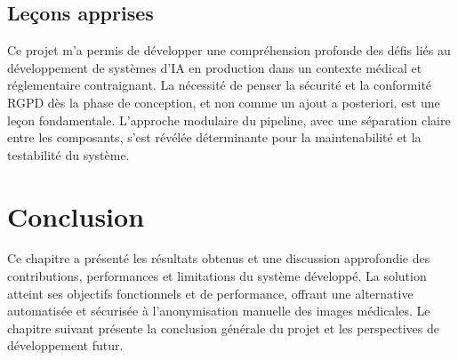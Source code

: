 \subsection{Leçons apprises}

Ce projet m'a permis de développer une compréhension profonde des défis liés au développement de systèmes d'IA en production dans un contexte médical et réglementaire contraignant. La nécessité de penser la sécurité et la conformité RGPD dès la phase de conception, et non comme un ajout a posteriori, est une leçon fondamentale. L'approche modulaire du pipeline, avec une séparation claire entre les composants, s'est révélée déterminante pour la maintenabilité et la testabilité du système.

\section*{Conclusion}
Ce chapitre a présenté les résultats obtenus et une discussion approfondie des contributions, performances et limitations du système développé. La solution atteint ses objectifs fonctionnels et de performance, offrant une alternative automatisée et sécurisée à l'anonymisation manuelle des images médicales. Le chapitre suivant présente la conclusion générale du projet et les perspectives de développement futur.
